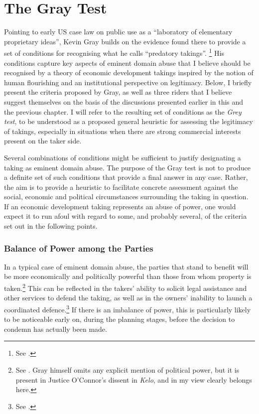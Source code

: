 \section{The Gray Test}\label{sec:3:5}

Pointing to early US case law on public use as a ``laboratory of elementary proprietary ideas'', Kevin Gray builds on the evidence found there to provide a set of conditions for recognising what he calls ``predatory takings''. \footnote{See \cite[28-30]{gray11}.} His conditions capture key aspects of eminent domain abuse that I believe should be recognised by a theory of economic development takings inspired by the notion of human flourishing and an institutional perspective on legitimacy. Below, I briefly present the criteria proposed by Gray, as well as three riders that I believe suggest themselves on the basis of the discussions presented earlier in this and the previous chapter. I will refer to the resulting set of conditions as the {\it Grey test}, to be understood as a proposed general heuristic for assessing the legitimacy of takings, especially in situations when there are strong commercial interests present on the taker side.

Several combinations of conditions might be sufficient to justify designating a taking as eminent domain abuse. The purpose of the Gray test is not to produce a definite set of such conditions that provide a final answer in any case. Rather, the aim is to provide a heuristic to facilitate concrete assessment against the social, economic and political circumstances surrounding the taking in question. If an economic development taking represents an abuse of power, one would expect it to run afoul with regard to some, and probably several, of the criteria set out in the following points.

\subsubsection*{Balance of Power among the Parties}

In a typical case of eminent domain abuse, the parties that stand to benefit will be more economically and politically powerful than those from whom property is taken.\footnote{See \cite[30-31]{gray11}. Gray himself omits any explicit mention of political power, but it is present in Justice O'Connor's dissent in {\it Kelo}, and in my view clearly belongs here.} This can be reflected in the takers' ability to solicit legal assistance and other services to defend the taking, as well as in the  owners' inability to launch a coordinated defence.\footnote{See \cite[30-31]{gray11}.} If there is an imbalance of power, this is particularly likely to be noticeable early on, during the planning stages, before the decision to condemn has actually been made. 

